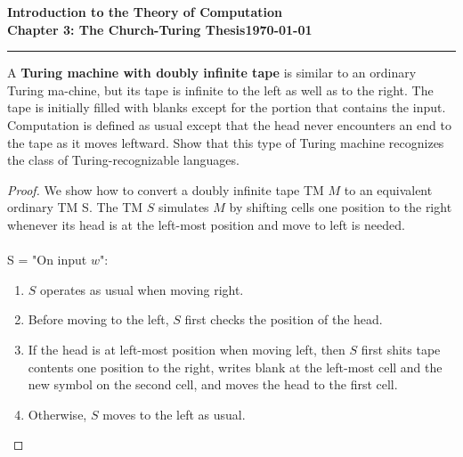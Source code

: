\documentclass[11pt]{article}
\newcommand{\dated}{\today}
\begin{document}
\textbf{Introduction to the Theory of
Computation}\hfill\textbf{\myname}\\[0.01in]
\textbf{Chapter 3: The Church-Turing Thesis}\hfill\textbf{\dated}\\
\smallskip\hrule\bigskip

\begin{problem}{3.11}
A \textbf{Turing machine with doubly infinite tape} is similar to an ordinary Turing ma-chine, but its tape is infinite to the left as well as to the right. The tape is initially filled with blanks except for the portion that contains the input. Computation is defined as usual except that the head never encounters an end to the tape as it moves leftward. Show that this type of Turing machine recognizes the class of Turing-recognizable languages.
\end{problem}

\begin{proof}
We show how to convert a doubly infinite tape TM $M$ to an equivalent ordinary TM S. The TM $S$ simulates $M$ by shifting cells one position to the right whenever its head is at the left-most position and move to left is needed.
\\
\\
S = "On input $w$":
\begin{enumerate}
\item $S$ operates as usual when moving right.
\item Before moving to the left, $S$ first checks the position of the head.
\item If the head is at left-most position when moving left, then $S$ first shits tape contents one position to the right, writes blank at the left-most cell and the new symbol on the second cell, and moves the head to the first cell.
\item Otherwise, $S$ moves to the left as usual.
\end{enumerate}
\end{proof}
\end{document}
